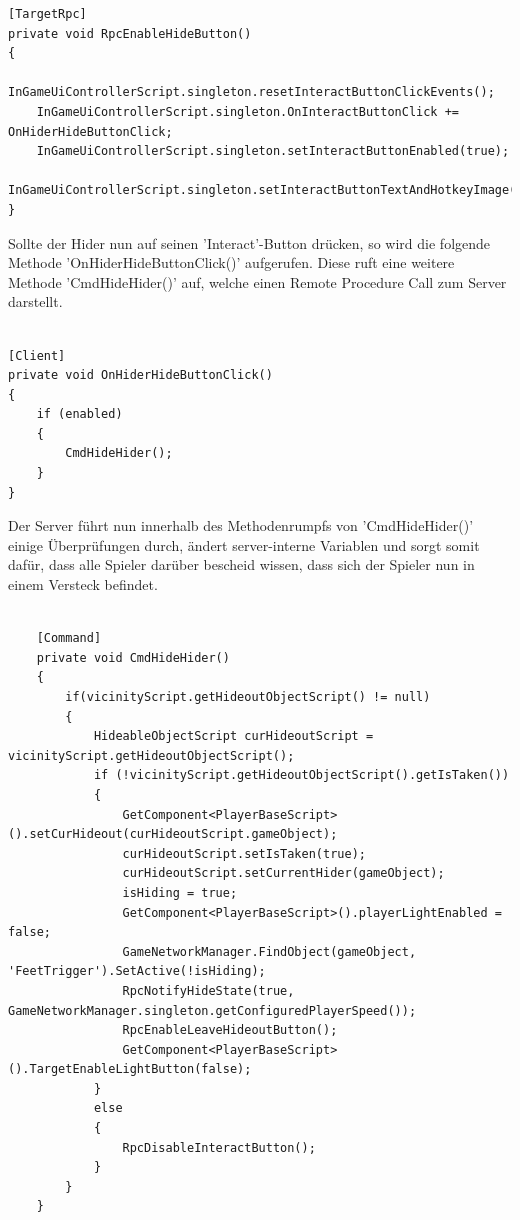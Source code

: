 \begin{lstlisting}[caption= HiderScript.cs Subscribe to InGameUiControllerScript Event]
[TargetRpc]
private void RpcEnableHideButton()
{
	InGameUiControllerScript.singleton.resetInteractButtonClickEvents();
	InGameUiControllerScript.singleton.OnInteractButtonClick += OnHiderHideButtonClick;
	InGameUiControllerScript.singleton.setInteractButtonEnabled(true);
	InGameUiControllerScript.singleton.setInteractButtonTextAndHotkeyImage('Hide');
}
\end{lstlisting}

Sollte der Hider nun auf seinen 'Interact'-Button drücken, so wird die folgende Methode 'OnHiderHideButtonClick()' aufgerufen. Diese ruft eine weitere Methode 'CmdHideHider()' auf, welche einen Remote Procedure Call\cite{.05.02.2022} zum Server darstellt.

\begin{lstlisting}[caption= HiderScript.csOnHiderHideButtonClick() Method]

[Client]
private void OnHiderHideButtonClick()
{
	if (enabled)
	{
		CmdHideHider();
	}
}

\end{lstlisting}

Der Server führt nun innerhalb des Methodenrumpfs von 'CmdHideHider()' einige Überprüfungen durch, ändert server-interne Variablen und sorgt somit dafür, dass alle Spieler darüber bescheid wissen, dass sich der Spieler nun in einem Versteck befindet.

\begin{lstlisting}[caption= HiderScript.cs Subscribe to InGameUiControllerScript Event]
	
	[Command]
	private void CmdHideHider()
	{
		if(vicinityScript.getHideoutObjectScript() != null)
		{
			HideableObjectScript curHideoutScript = vicinityScript.getHideoutObjectScript();
			if (!vicinityScript.getHideoutObjectScript().getIsTaken())
			{
				GetComponent<PlayerBaseScript>().setCurHideout(curHideoutScript.gameObject);
				curHideoutScript.setIsTaken(true);
				curHideoutScript.setCurrentHider(gameObject);
				isHiding = true;
				GetComponent<PlayerBaseScript>().playerLightEnabled = false;
				GameNetworkManager.FindObject(gameObject, 'FeetTrigger').SetActive(!isHiding);
				RpcNotifyHideState(true, GameNetworkManager.singleton.getConfiguredPlayerSpeed());
				RpcEnableLeaveHideoutButton();
				GetComponent<PlayerBaseScript>().TargetEnableLightButton(false);
			}
			else
			{
				RpcDisableInteractButton();
			}
		}
	}	
\end{lstlisting}

